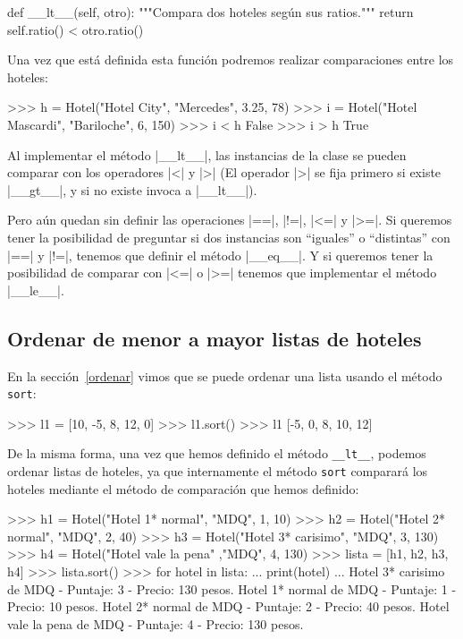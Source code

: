 \begin{codigo-python-sn}
    def __lt__(self, otro):
        """Compara dos hoteles según sus ratios."""
        return self.ratio() < otro.ratio()
\end{codigo-python-sn}

Una vez que está definida esta función podremos realizar comparaciones
entre los hoteles:

\begin{codigo-python-sn}
>>> h = Hotel("Hotel City", "Mercedes", 3.25, 78)
>>> i = Hotel("Hotel Mascardi", "Bariloche", 6, 150)
>>> i < h
False
>>> i > h
True
\end{codigo-python-sn}

Al implementar el método |__lt__|, las instancias de la clase se pueden
comparar con los operadores |<| y |>| (El operador |>| se fija primero si
existe |__gt__|, y si no existe invoca a |__lt__|).

Pero aún quedan sin definir las operaciones |==|, |!=|, |<=| y |>=|.  Si
queremos tener la posibilidad de preguntar si dos instancias son \enquote{iguales} o
\enquote{distintas} con |==| y |!=|, tenemos que definir el método |__eq__|. Y si
queremos tener la posibilidad de comparar con |<=| o |>=| tenemos que
implementar el método |__le__|.

\subsection{Ordenar de menor a mayor listas de hoteles}

En la sección~\ref{ordenar} vimos que se puede ordenar una lista usando el
método \lstinline!sort!:

\begin{codigo-python-sn}
>>> l1 = [10, -5, 8, 12, 0]
>>> l1.sort()
>>> l1
[-5, 0, 8, 10, 12]
\end{codigo-python-sn}

De la misma forma, una vez que hemos definido el método
\lstinline!__lt__!, podemos ordenar listas de hoteles, ya que
internamente el método \lstinline!sort! comparará los hoteles mediante
el método de comparación que hemos definido:

\begin{codigo-python-sn}
>>> h1 = Hotel("Hotel 1* normal", "MDQ", 1, 10)
>>> h2 = Hotel("Hotel 2* normal", "MDQ", 2, 40)
>>> h3 = Hotel("Hotel 3* carisimo", "MDQ", 3, 130)
>>> h4 = Hotel("Hotel vale la pena" ,"MDQ", 4, 130)
>>> lista = [h1, h2, h3, h4]
>>> lista.sort()
>>> for hotel in lista:
...     print(hotel)
...
Hotel 3* carisimo de MDQ - Puntaje: 3 - Precio: 130 pesos.
Hotel 1* normal de MDQ - Puntaje: 1 - Precio: 10 pesos.
Hotel 2* normal de MDQ - Puntaje: 2 - Precio: 40 pesos.
Hotel vale la pena de MDQ - Puntaje: 4 - Precio: 130 pesos.
\end{codigo-python-sn}

